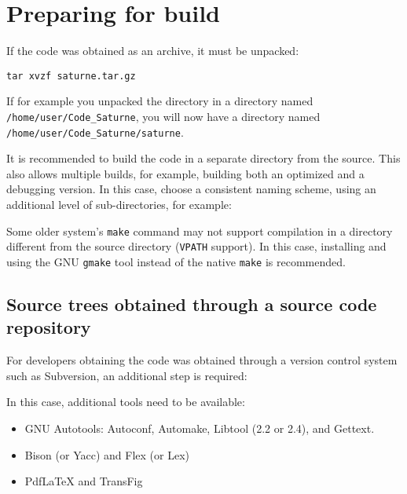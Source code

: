 \documentclass[a4paper,10pt,twoside]{csshortdoc}
\begin{document}
\section{Preparing for build\label{sec:prepare}}

If the code was obtained as an archive, it must be unpacked:

\texttt{tar xvzf saturne.tar.gz}

If for example you unpacked the directory in a directory
named \texttt{/home/user/Code\_Saturne}, you will now
have a directory named \texttt{/home/user/Code\_Saturne/saturne}.

It is recommended to build the code in a separate directory from the source.
This also allows multiple builds, for example, building both an
optimized and a debugging version. In this case, choose a consistent
naming scheme, using an additional level of sub-directories,
for example:


Some older system's {\tt make} command may not support compilation
in a directory different from the source directory ({\tt VPATH}
support). In this case, installing and using the GNU {\tt gmake}
tool instead of the native {\tt make} is recommended.

\subsection{Source trees obtained through a source code repository\label{sec:preparerepo}}

For developers obtaining the code was obtained through a version control
system such as Subversion, an additional step is required:


In this case, additional tools need to be available:

\begin{itemize}
\item GNU Autotools: Autoconf, Automake, Libtool (2.2 or 2.4), and Gettext.
\item Bison (or Yacc) and Flex (or Lex)
\item PdfLaTeX and TransFig
\end{itemize}
\end{document}
